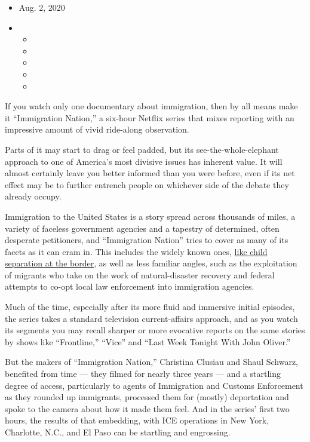 \begin{itemize}
\item
  Aug. 2, 2020
\item
  \begin{itemize}
  \item
  \item
  \item
  \item
  \item
  \end{itemize}
\end{itemize}

If you watch only one documentary about immigration, then by all means
make it ``Immigration Nation,'' a six-hour Netflix series that mixes
reporting with an impressive amount of vivid ride-along observation.

Parts of it may start to drag or feel padded, but its
see-the-whole-elephant approach to one of America's most divisive issues
has inherent value. It will almost certainly leave you better informed
than you were before, even if its net effect may be to further entrench
people on whichever side of the debate they already occupy.

Immigration to the United States is a story spread across thousands of
miles, a variety of faceless government agencies and a tapestry of
determined, often desperate petitioners, and ``Immigration Nation''
tries to cover as many of its facets as it can cram in. This includes
the widely known ones,
\href{https://www.nytimes3xbfgragh.onion/2019/03/09/us/migrant-family-separations-border.html}{like
child separation at the border}, as well as less familiar angles, such
as the exploitation of migrants who take on the work of natural-disaster
recovery and federal attempts to co-opt local law enforcement into
immigration agencies.

Much of the time, especially after its more fluid and immersive initial
episodes, the series takes a standard television current-affairs
approach, and as you watch its segments you may recall sharper or more
evocative reports on the same stories by shows like ``Frontline,''
``Vice'' and ``Last Week Tonight With John Oliver.''

But the makers of ``Immigration Nation,'' Christina Clusiau and Shaul
Schwarz, benefited from time --- they filmed for nearly three years ---
and a startling degree of access, particularly to agents of Immigration
and Customs Enforcement as they rounded up immigrants, processed them
for (mostly) deportation and spoke to the camera about how it made them
feel. And in the series' first two hours, the results of that embedding,
with ICE operations in New York, Charlotte, N.C., and El Paso can be
startling and engrossing.

